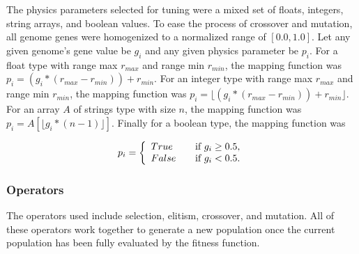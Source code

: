 The physics parameters selected for tuning were a mixed set of floats, integers, string arrays, and boolean values. To ease the process of crossover and mutation, all genome genes were homogenized to a normalized range of $[0.0,1.0]$. Let any given genome's gene value be $g_i$ and any given physics parameter be $p_i$. For a float type with range max $r_{max}$ and range min $r_{min}$, the mapping function was $p_i=(g_i*(r_{max}-r_{min}))+r_{min}$. For an integer type with range max $r_{max}$ and range min $r_{min}$, the mapping function was $p_i=\lfloor(g_i*(r_{max}-r_{min}))+r_{min}\rfloor$. For an array $A$ of strings type with size $n$, the mapping function was $p_i=A[\lfloor g_i*(n-1)\rfloor]$. Finally for a boolean type, the mapping function was 

\[ p_i = \left\{
\begin{array}{l l}
True & \quad \text{if $g_i\geq 0.5$,}\\
False & \quad \text{if $g_i < 0.5$.}
\end{array} 
\right.\]

\subsubsection{Operators}

The operators used include selection, elitism, crossover, and mutation. All of these operators work together to generate a new population once the current population has been fully evaluated by the fitness function.

